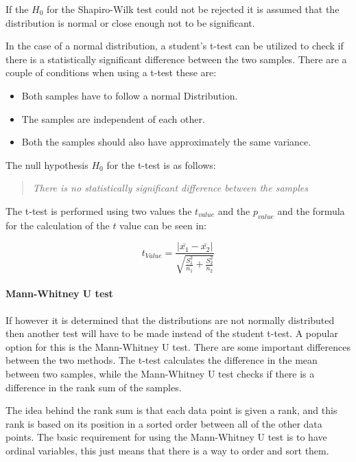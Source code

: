 If the $H_0$ for the Shapiro-Wilk test could not be rejected it is assumed that the distribution is normal or close enough not to be significant.

In the case of a normal distribution, a student's t-test can be utilized to check if there is a statistically significant difference between the two samples. There are a couple of conditions when using a t-test these are:

\begin{itemize}
    \item Both samples have to follow a normal Distribution.
    \item The samples are independent of each other.
    \item Both the samples should also have approximately the same variance.
\end{itemize}

The null hypothesis $H_0$ for the t-test is as follows:

\begin{quote}
    \textit{There is no statistically significant difference between the samples}    
\end{quote}

The t-test is performed using two values the $t_{value}$ and the $p_{value}$ and the formula for the calculation of the $t$ value can be seen in:

\begin{equation}
    t_{Value} = \frac{|\bar{x_1}- \bar{x_2}|}{\sqrt{\frac{S_1^2}{n_1} + \frac{S_2^2}{n_2}}}  
\end{equation}

\paragraph{Mann-Whitney U test}
If however it is determined that the distributions are not normally distributed then another test will have to be made instead of the student t-test. A popular option for this is the Mann-Whitney U test. There are some important differences between the two methods. The t-test calculates the difference in the mean between two samples, while the Mann-Whitney U test checks if there is a difference in the rank sum of the samples.\cite{mann1947test} 

The idea behind the rank sum is that each data point is given a rank, and this rank is based on its position in a sorted order between all of the other data points. 
The basic requirement for using the Mann-Whitney U test is to have ordinal variables, this just means that there is a way to order and sort them.

